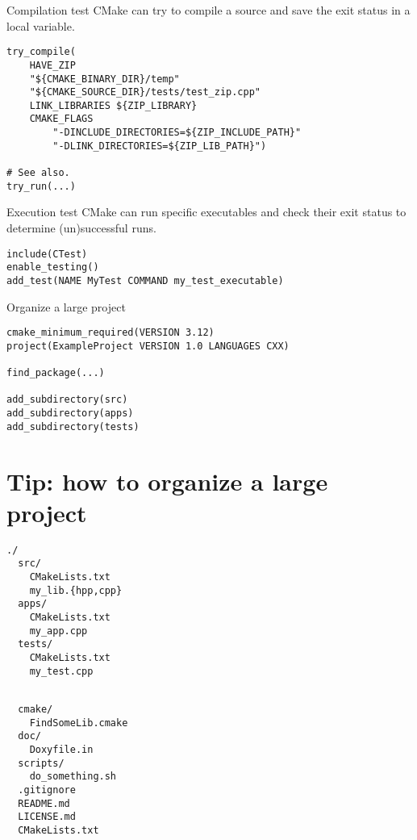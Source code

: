 \documentclass[aspectratio=169,11pt]{beamer}
\begin{document}
\begin{frame}[fragile]{Compilation test}
CMake can try to compile a source and save the exit status in a local variable.
\begin{verbatim}
try_compile(
    HAVE_ZIP
    "${CMAKE_BINARY_DIR}/temp"
    "${CMAKE_SOURCE_DIR}/tests/test_zip.cpp"
    LINK_LIBRARIES ${ZIP_LIBRARY}
    CMAKE_FLAGS
        "-DINCLUDE_DIRECTORIES=${ZIP_INCLUDE_PATH}"
        "-DLINK_DIRECTORIES=${ZIP_LIB_PATH}")

# See also.
try_run(...)
\end{verbatim}
\end{frame}

\begin{frame}[fragile]{Execution test}
CMake can run specific executables and check their exit status to determine (un)successful runs.
\begin{verbatim}
include(CTest)
enable_testing()
add_test(NAME MyTest COMMAND my_test_executable)
\end{verbatim}
\end{frame}

\begin{frame}[fragile]{Organize a large project}
\begin{verbatim}
cmake_minimum_required(VERSION 3.12)
project(ExampleProject VERSION 1.0 LANGUAGES CXX)

find_package(...)

add_subdirectory(src)
add_subdirectory(apps)
add_subdirectory(tests)
\end{verbatim}
\end{frame}


\section{Tip: how to organize a large project}
\begin{frame}[fragile]
\Large
\begin{minipage}[t]{.5\linewidth}
\begin{verbatim}
./
  src/
    CMakeLists.txt
    my_lib.{hpp,cpp}
  apps/
    CMakeLists.txt
    my_app.cpp
  tests/
    CMakeLists.txt
    my_test.cpp
\end{verbatim}
\end{minipage}%
\begin{minipage}[t]{.5\linewidth}
\begin{verbatim}

  cmake/
    FindSomeLib.cmake
  doc/
    Doxyfile.in
  scripts/
    do_something.sh
  .gitignore
  README.md
  LICENSE.md
  CMakeLists.txt
\end{verbatim}
\end{minipage}
\end{frame}
\end{document}
